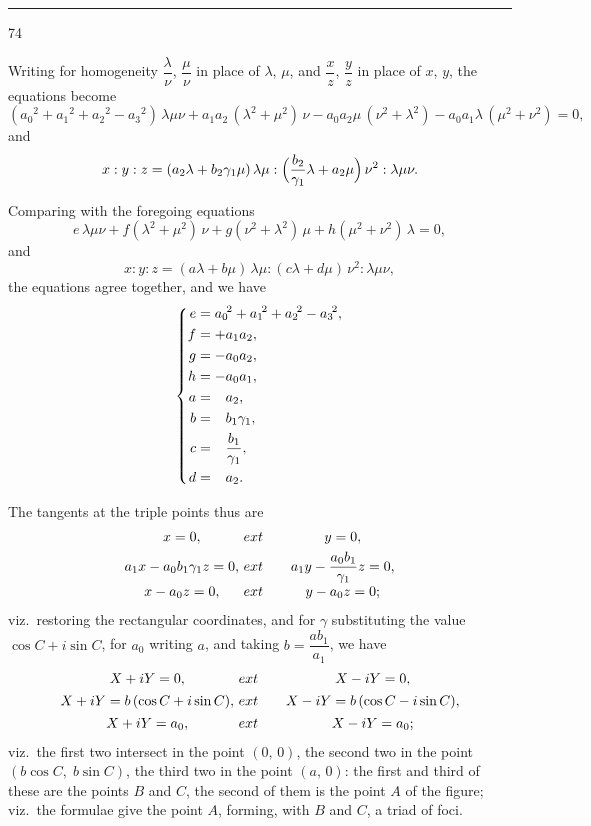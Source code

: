 \documentclass[12pt,a4paper]{article}
\begin{document}
\vspace{1ex}
\noindent\rule{2em}{0.4pt}\hfill 74

\newpage

\noindent
Writing for homogeneity $\dfrac{\lambda}{\nu}$, $\dfrac{\mu}{\nu}$ in place of $\lambda$, $\mu$, and $\dfrac{x}{z}$, $\dfrac{y}{z}$ in place of $x$, $y$, the equations become
\[
(a_0{}^{\!2} + a_1{}^{\!2} + a_2{}^{\!2} - a_3{}^{\!2})\,\lambda\mu\nu + a_1a_2\,(\lambda^2+\mu^2)\,\nu - a_0a_2\mu\,(\nu^2+\lambda^2) - a_0a_1\lambda\,(\mu^2+\nu^2) = 0,
\]
and
\[
x:y:z = (a_2\lambda + b_2\gamma_1\mu)\,\lambda\mu : \Bigl(\frac{b_2}{\gamma_1}\lambda + a_2\mu\Bigr)\,\nu^2 : \lambda\mu\nu.
\]

Comparing with the foregoing equations
\[
e\,\lambda\mu\nu + f(\lambda^2+\mu^2)\,\nu + g(\nu^2+\lambda^2)\,\mu + h(\mu^2+\nu^2)\,\lambda = 0,
\]
and
\[
x:y:z = (a\lambda+b\mu)\,\lambda\mu : (c\lambda+d\mu)\,\nu^2 : \lambda\mu\nu,
\]
the equations agree together, and we have
\[
\left\{\begin{aligned}
e &= a_0{}^{\!2} + a_1{}^{\!2} + a_2{}^{\!2} - a_3{}^{\!2}, \\
f &= +a_1a_2, \\
g &= -a_0a_2, \\
h &= -a_0a_1, \\
a &= \hphantom{+}a_2, \\
b &= \hphantom{+}b_1\gamma_1, \\
c &= \hphantom{+}\frac{b_1}{\gamma_1}, \\
d &= \hphantom{+}a_2.
\end{aligned}\right.
\]

The tangents at the triple points thus are
\[
\begin{array}{c@{\	ext{\qquad}}c}
x = 0, & y = 0, \\[4pt]
a_1x - a_0b_1\gamma_1 z = 0, & a_1y - \dfrac{a_0b_1}{\gamma_1} z = 0, \\[6pt]
x - a_0z = 0, & y - a_0z = 0;
\end{array}
\]
viz.\ restoring the rectangular coordinates, and for $\gamma$ substituting the value $\cos C + i\sin C$, for $a_0$ writing $a$, and taking $b = \dfrac{ab_1}{a_1}$, we have
\[
\begin{array}{c@{\	ext{\qquad}}c}
X + iY = 0, & X - iY = 0, \\[4pt]
X + iY = b\, (\cos C + i\sin C), & X - iY = b\, (\cos C - i\sin C), \\[4pt]
X + iY = a_0, & X - iY = a_0;
\end{array}
\]
viz.\ the first two intersect in the point $(0,\,0)$, the second two in the point $(b\cos C,\; b\sin C)$, the third two in the point $(a,\,0)$: the first and third of these are the points $B$ and $C$, the second of them is the point $A$ of the figure; viz.\ the formulae give the point $A$, forming, with $B$ and $C$, a triad of foci.
\end{document}
